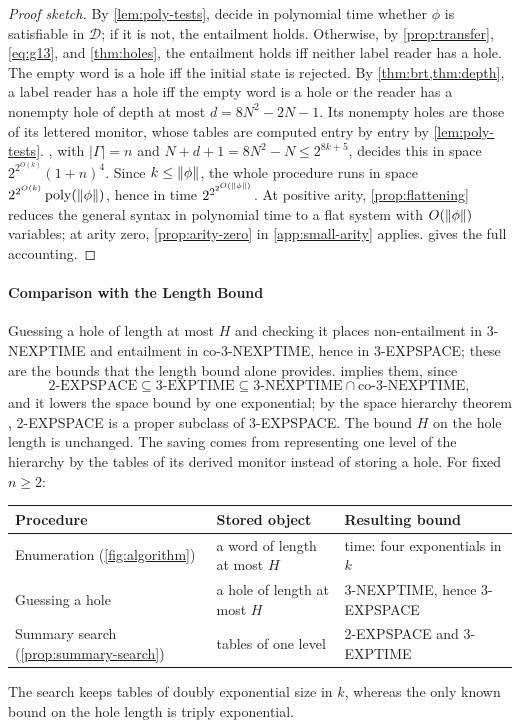 \begin{proof}[Proof sketch]
By \cref{lem:poly-tests}, decide in polynomial time whether $\phi$ is
satisfiable in $\mathcal D$; if it is not, the entailment holds. Otherwise,
by \cref{prop:transfer}, \eqref{eq:g13}, and \cref{thm:holes}, the entailment
holds iff neither label reader has a hole. The empty word is a hole iff the
initial state is rejected. By \cref{thm:brt,thm:depth}, a label reader has a
hole iff the empty word is a hole or the reader has a nonempty hole of depth
at most $d=8N^2-2N-1$. Its nonempty holes are those of its lettered monitor,
whose tables are computed entry by entry by \cref{lem:poly-tests}.
, with $|\Gamma|=n$ and
$N+d+1=8N^2-N\le2^{8k+5}$, decides this in space $2^{2^{O(k)}}(1+n)^4$.
Since $k\le\|\phi\|$, the whole procedure runs in space
$2^{2^{O(k)}}\operatorname{poly}(\|\phi\|)$, hence in time
$2^{2^{2^{O(\|\phi\|)}}}$. At positive arity, \cref{prop:flattening}
reduces the general syntax in polynomial time to a flat system with
$O(\|\phi\|)$ variables; at arity zero, \cref{prop:arity-zero} in
\cref{app:small-arity} applies.
 gives the full accounting.
\end{proof}

\paragraph{Comparison with the Length Bound}
Guessing a hole of length at most $H$ and checking it places non-entailment
in 3-NEXPTIME and entailment in co-3-NEXPTIME, hence in 3-EXPSPACE; these are
the bounds that the length bound alone provides. 
implies them, since
\[
 \text{2-EXPSPACE}\subseteq\text{3-EXPTIME}\subseteq
 \text{3-NEXPTIME}\cap\text{co-3-NEXPTIME},
\]
and it lowers the space bound by one exponential; by the space hierarchy
theorem \citep[Theorem~6]{StearnsHartmanisLewis65}, 2-EXPSPACE is a proper
subclass of 3-EXPSPACE. The bound $H$ on the hole length is unchanged. The
saving comes from representing one level of the hierarchy by the tables of
its derived monitor instead of storing a hole. For fixed $n\ge2$:
\begin{center}
\small
\begin{tabular}{@{}lll@{}}
\toprule
Procedure & Stored object & Resulting bound\\
\midrule
Enumeration (\cref{fig:algorithm}) & a word of length at most $H$ & time: four exponentials in $k$\\
Guessing a hole & a hole of length at most $H$ & 3-NEXPTIME, hence 3-EXPSPACE\\
Summary search (\cref{prop:summary-search}) & tables of one level & 2-EXPSPACE and 3-EXPTIME\\
\bottomrule
\end{tabular}
\end{center}
The search keeps tables of doubly exponential size in $k$, whereas the only
known bound on the hole length is triply exponential.


